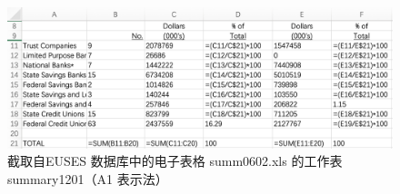 \begin{figure}[tp]    
    \centering
    \includegraphics[width=\textwidth]{figure/style-A1.png}
    \caption{截取自EUSES 数据库中的电子表格 summ0602.xls 的工作表summary1201（A1 表示法）}
    \label{figure-A1}
\end{figure}
